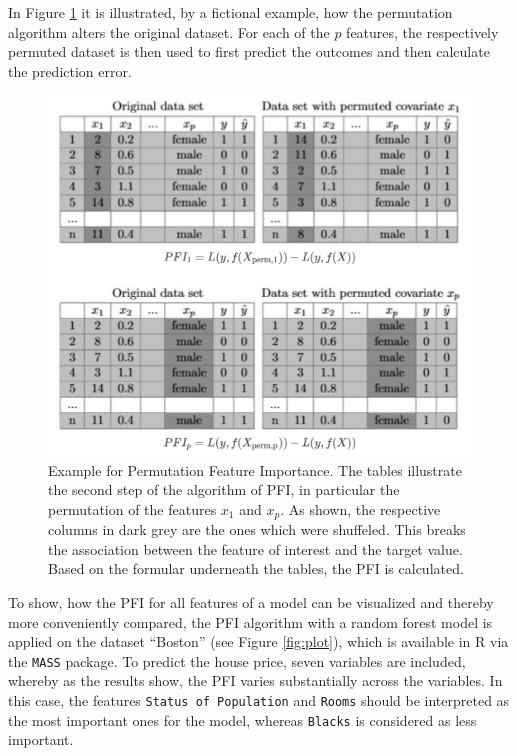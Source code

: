 \documentclass[]{krantz}
\begin{document}
In Figure \ref{fig:PFI} it is illustrated, by a fictional example, how
the permutation algorithm alters the original dataset. For each of the
\(p\) features, the respectively permuted dataset is then used to first
predict the outcomes and then calculate the prediction error.

\begin{figure}

{\centering \includegraphics[width=0.65\linewidth]{images/Permutation_All} 

}

\caption{Example for Permutation Feature Importance. The tables illustrate the second step of the algorithm of PFI, in particular the permutation of the features $x_{1}$ and $x_{p}$. As shown, the respective columns in dark grey are the ones which were shuffeled. This breaks the association between the feature of interest and the target value. Based on the formular underneath the tables, the PFI is calculated.}\label{fig:PFI}
\end{figure}

To show, how the PFI for all features of a model can be visualized and
thereby more conveniently compared, the PFI algorithm with a random
forest model is applied on the dataset ``Boston'' (see Figure
\ref{fig:plot}), which is available in R via the \texttt{MASS} package.
To predict the house price, seven variables are included, whereby as the
results show, the PFI varies substantially across the variables. In this
case, the features \texttt{Status\ of\ Population} and \texttt{Rooms}
should be interpreted as the most important ones for the model, whereas
\texttt{Blacks} is considered as less important.
\end{document}
